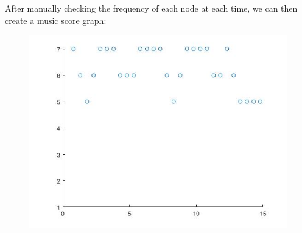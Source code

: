 \documentclass[12pt]{article}
\begin{document}
After manually checking the frequency of each node at each time, we can then create a music score graph:
\begin{figure}[H]
\includegraphics[width=\linewidth]{score.jpg}
\end{figure}
\end{document}
